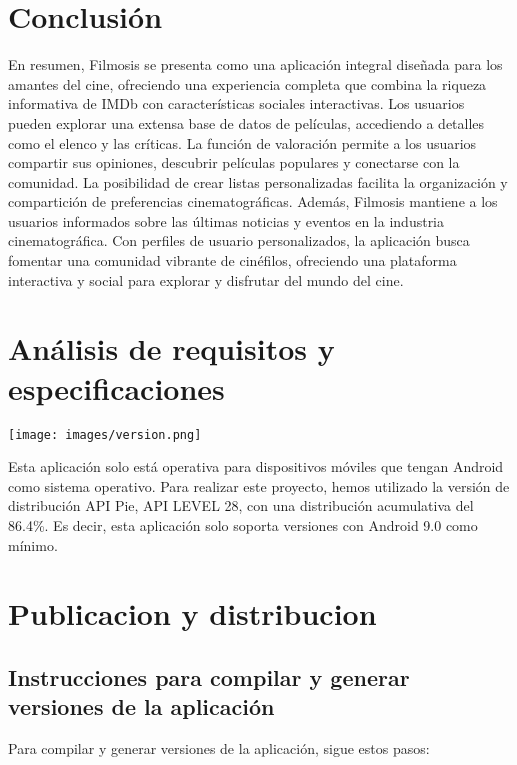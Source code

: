 \documentclass{article}
\begin{document}
\newpage

\section{Conclusión}

En resumen, Filmosis se presenta como una aplicación integral diseñada para los amantes del cine, ofreciendo una experiencia completa que combina la riqueza informativa de IMDb con características sociales interactivas. Los usuarios pueden explorar una extensa base de datos de películas, accediendo a detalles como el elenco y las críticas. La función de valoración permite a los usuarios compartir sus opiniones, descubrir películas populares y conectarse con la comunidad. La posibilidad de crear listas personalizadas facilita la organización y compartición de preferencias cinematográficas. Además, Filmosis mantiene a los usuarios informados sobre las últimas noticias y eventos en la industria cinematográfica. Con perfiles de usuario personalizados, la aplicación busca fomentar una comunidad vibrante de cinéfilos, ofreciendo una plataforma interactiva y social para explorar y disfrutar del mundo del cine.
\section{Análisis de requisitos y especificaciones}
\begin{minipage}{0.4\textwidth}
    \texttt{[image: images/version.png]}
\end{minipage}
\hfill
\begin{minipage}{0.55\textwidth}
Esta aplicación solo está operativa para dispositivos móviles que tengan Android como sistema operativo. Para realizar este proyecto, hemos utilizado la versión de distribución API Pie, API LEVEL 28, con una distribución acumulativa del 86.4\%. Es decir, esta aplicación solo soporta versiones con Android 9.0 como mínimo.
\end{minipage}
\section{Publicacion y distribucion}
\subsection{Instrucciones para compilar y generar versiones de la aplicación}

Para compilar y generar versiones de la aplicación, sigue estos pasos:
\end{document}
